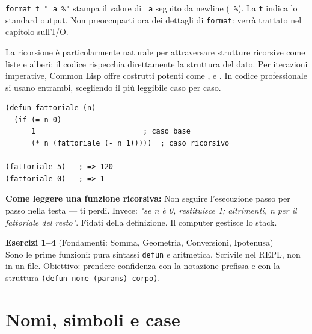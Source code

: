 \begin{nota}
\texttt{format t "~a~\%"} stampa il valore di \texttt{~a} seguito da
newline (\texttt{~\%}). La \texttt{t} indica lo standard output.
Non preoccuparti ora dei dettagli di \texttt{format}: verrà trattato
nel capitolo sull'I/O.
\end{nota}


La ricorsione è particolarmente naturale per attraversare strutture
ricorsive come liste e alberi: il codice rispecchia direttamente
la struttura del dato.
Per iterazioni imperative, Common Lisp offre costrutti potenti
come ,  e .
In codice professionale si usano entrambi, scegliendo
il più leggibile caso per caso.

\begin{esempio}
\begin{lstlisting}
(defun fattoriale (n)
  (if (= n 0)
      1                         ; caso base
      (* n (fattoriale (- n 1)))))  ; caso ricorsivo

(fattoriale 5)   ; => 120
(fattoriale 0)   ; => 1
\end{lstlisting}
\end{esempio}


\begin{intuizione}
\textbf{Come leggere una funzione ricorsiva:}
Non seguire l'esecuzione passo per passo nella testa — ti perdi.
Invece: \emph{"se n è 0, restituisce 1; altrimenti, n per il
fattoriale del resto"}.
Fidati della definizione. Il computer gestisce lo stack.
\end{intuizione}

\begin{workbook}
\textbf{Esercizi 1--4} (Fondamenti: Somma, Geometria, Conversioni, Ipotenusa)\\[4pt]
Sono le prime funzioni: pura sintassi \texttt{defun} e aritmetica.
Scrivile nel REPL, non in un file. Obiettivo: prendere confidenza con
la notazione prefissa e con la struttura \texttt{(defun nome (params) corpo)}.
\end{workbook}

\section{Nomi, simboli e case}

